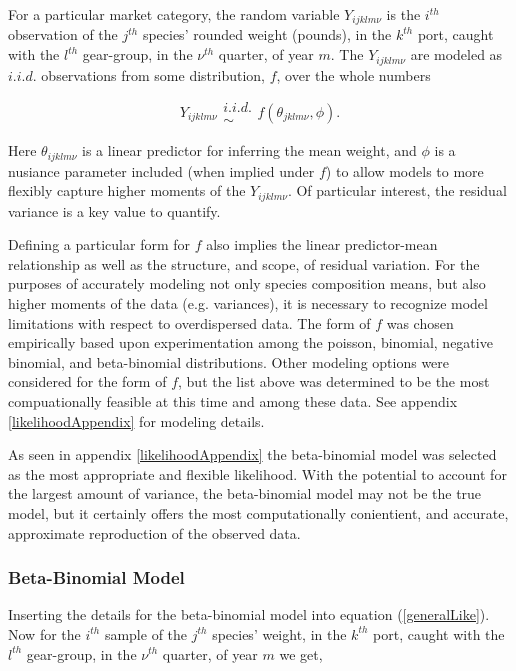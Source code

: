 \documentclass[12pt]{article}
\begin{document}
%
For a particular market category, the random variable \(Y_{ijklm\nu}\) is the 
\(i^{th}\) observation of the \(j^{th}\) species' rounded weight (pounds), 
in the \(k^{th}\) port, caught with the \(l^{th}\) gear-group, in the \(\nu^{th}\) 
quarter, of year \(m\). The \(Y_{ijklm\nu}\) are modeled as $i.i.d.$ 
observations from some distribution, $f$, over the whole numbers

\begin{equation}
Y_{ijklm\nu} \substack{i.i.d.\\\sim} f(\theta_{jklm\nu}, \phi).
\label{generalLike}
\end{equation}

%
Here $\theta_{ijklm\nu}$ is a linear predictor for inferring the mean weight, 
and $\phi$ is a nusiance parameter included (when implied under $f$) to allow 
models to more flexibly capture higher moments of the \(Y_{ijklm\nu}\). Of 
particular interest, the residual variance is a key value to quantify.

%
Defining a particular form for $f$ also implies the linear predictor-mean 
relationship as well as the structure, and scope, of residual variation. For 
the purposes of accurately modeling not only species composition means, but 
also higher moments of the data (e.g. variances), it is necessary to recognize 
model limitations with respect to overdispersed data. The form of $f$ was 
chosen empirically based upon experimentation among the poisson, binomial, 
negative binomial, and beta-binomial distributions. Other modeling options 
were considered for the form of $f$, but the list above was determined to be 
the most compuationally feasible at this time and among these data. See 
{\color{red}appendix \ref{likelihoodAppendix}} for modeling details. 

% 
As seen in {\color{red}appendix \ref{likelihoodAppendix}} the beta-binomial model was 
selected as the most appropriate and flexible likelihood. With the potential 
to account for the largest amount of variance, the beta-binomial model may 
not be the true model, but it certainly offers the most computationally 
conientient, and accurate, approximate reproduction of the observed data. 

\subsubsection{Beta-Binomial Model}\label{bbModel}

%
Inserting the details for the beta-binomial model into equation 
(\ref{generalLike}). Now for the \(i^{th}\) sample of the \(j^{th}\) species' 
weight, in the \(k^{th}\) port, caught with the \(l^{th}\) gear-group, in the 
\(\nu^{th}\) quarter, of year \(m\) we get,
\end{document}
